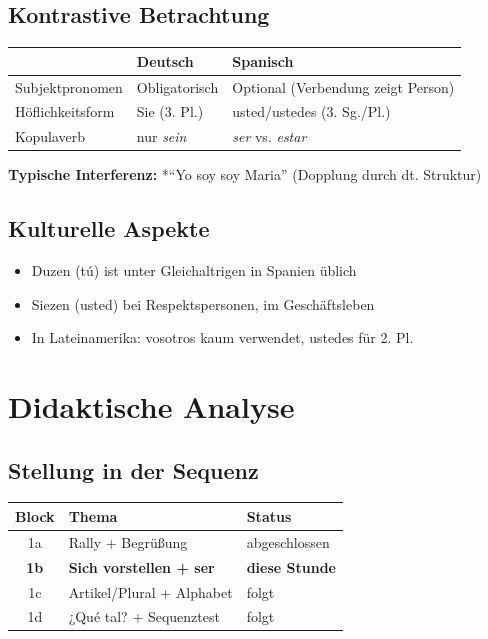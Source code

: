 \documentclass[11pt,a4paper]{article}
\begin{document}
\subsection{Kontrastive Betrachtung}

\begin{tabular}{|l|p{5cm}|p{5cm}|}
\hline
& \textbf{Deutsch} & \textbf{Spanisch} \\
\hline
Subjektpronomen & Obligatorisch & Optional (Verbendung zeigt Person) \\
\hline
Höflichkeitsform & Sie (3. Pl.) & usted/ustedes (3. Sg./Pl.) \\
\hline
Kopulaverb & nur \textit{sein} & \textit{ser} vs. \textit{estar} \\
\hline
\end{tabular}

\textbf{Typische Interferenz:} *``Yo soy soy Maria'' (Dopplung durch dt. Struktur)

\subsection{Kulturelle Aspekte}
\begin{itemize}
    \item Duzen (tú) ist unter Gleichaltrigen in Spanien üblich
    \item Siezen (usted) bei Respektspersonen, im Geschäftsleben
    \item In Lateinamerika: vosotros kaum verwendet, ustedes für 2. Pl.
\end{itemize}

\section{Didaktische Analyse}

\subsection{Stellung in der Sequenz}
\begin{tabular}{|c|l|l|}
\hline
\textbf{Block} & \textbf{Thema} & \textbf{Status} \\
\hline
1a & Rally + Begrüßung & abgeschlossen \\
\textbf{1b} & \textbf{Sich vorstellen + ser} & \textbf{diese Stunde} \\
1c & Artikel/Plural + Alphabet & folgt \\
1d & ¿Qué tal? + Sequenztest & folgt \\
\hline
\end{tabular}
\end{document}
